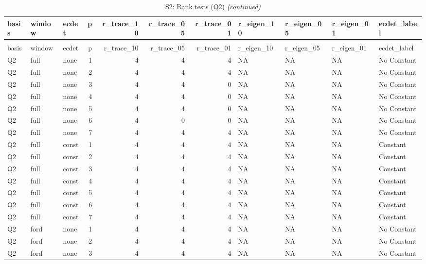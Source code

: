 \begingroup\fontsize{9}{11}\selectfont

\begin{longtable}[t]{lllrrrrllll}
\caption{\label{tab:tab:S2_rank_all_Q2}S2: Rank tests (Q2)}\\
\toprule
basis & window & ecdet & p & r\_trace\_10 & r\_trace\_05 & r\_trace\_01 & r\_eigen\_10 & r\_eigen\_05 & r\_eigen\_01 & ecdet\_label\\
\midrule
\endfirsthead
\caption[]{S2: Rank tests (Q2) \textit{(continued)}}\\
\toprule
basis & window & ecdet & p & r\_trace\_10 & r\_trace\_05 & r\_trace\_01 & r\_eigen\_10 & r\_eigen\_05 & r\_eigen\_01 & ecdet\_label\\
\midrule
\endhead

\endfoot
\bottomrule
\endlastfoot
Q2 & full & none & 1 & 4 & 4 & 4 & NA & NA & NA & No Constant\\
Q2 & full & none & 2 & 4 & 4 & 4 & NA & NA & NA & No Constant\\
Q2 & full & none & 3 & 4 & 4 & 0 & NA & NA & NA & No Constant\\
Q2 & full & none & 4 & 4 & 4 & 0 & NA & NA & NA & No Constant\\
Q2 & full & none & 5 & 4 & 4 & 0 & NA & NA & NA & No Constant\\
\addlinespace
Q2 & full & none & 6 & 4 & 0 & 0 & NA & NA & NA & No Constant\\
Q2 & full & none & 7 & 4 & 4 & 4 & NA & NA & NA & No Constant\\
Q2 & full & const & 1 & 4 & 4 & 4 & NA & NA & NA & Constant\\
Q2 & full & const & 2 & 4 & 4 & 4 & NA & NA & NA & Constant\\
Q2 & full & const & 3 & 4 & 4 & 4 & NA & NA & NA & Constant\\
\addlinespace
Q2 & full & const & 4 & 4 & 4 & 4 & NA & NA & NA & Constant\\
Q2 & full & const & 5 & 4 & 4 & 4 & NA & NA & NA & Constant\\
Q2 & full & const & 6 & 4 & 4 & 4 & NA & NA & NA & Constant\\
Q2 & full & const & 7 & 4 & 4 & 4 & NA & NA & NA & Constant\\
Q2 & ford & none & 1 & 4 & 4 & 4 & NA & NA & NA & No Constant\\
\addlinespace
Q2 & ford & none & 2 & 4 & 4 & 4 & NA & NA & NA & No Constant\\
Q2 & ford & none & 3 & 4 & 4 & 4 & NA & NA & NA & No Constant\\

\end{longtable}

